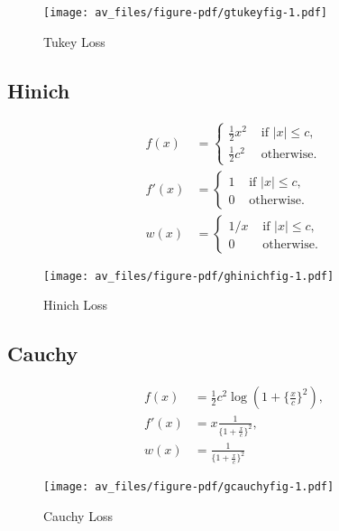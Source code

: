 \documentclass[
  12pt,
  letterpaper,
  DIV=11,
  numbers=noendperiod]{scrartcl}
\theoremstyle{plain}
\theoremstyle{plain}
\theoremstyle{plain}
\theoremstyle{definition}
\theoremstyle{remark}
\begin{document}
\begin{figure}[H]

{\centering \texttt{[image: av\_files/figure-pdf/gtukeyfig-1.pdf]}

}

\caption{Tukey Loss}

\end{figure}%

\subsection{Hinich}\label{hinich}

\begin{align}
f(x)&=\begin{cases}
\frac12 x^2&\text{ if } |x|\leq c,\\
\frac12 c^2&\text{ otherwise}.
\end{cases}\\
f'(x)&=\begin{cases}
1&\text{ if } |x|\leq c,\\
0&\text{ otherwise}.
\end{cases}\\
w(x)&=\begin{cases}
1/x&\text{ if } |x|\leq c,\\
0&\text{ otherwise}.
\end{cases}
\end{align}

\begin{figure}[H]

{\centering \texttt{[image: av\_files/figure-pdf/ghinichfig-1.pdf]}

}

\caption{Hinich Loss}

\end{figure}%

\subsection{Cauchy}\label{cauchy}

\begin{align}
f(x)&=\frac12c^2\log(1+\{\frac{x}{c}\}^2),\\
f'(x)&=x\frac{1}{\{1+\frac{x}{c}\}^2},\\
w(x)&=\frac{1}{\{1+\frac{x}{c}\}^2}
\end{align}

\begin{figure}[H]

{\centering \texttt{[image: av\_files/figure-pdf/gcauchyfig-1.pdf]}

}

\caption{Cauchy Loss}

\end{figure}%
\end{document}
